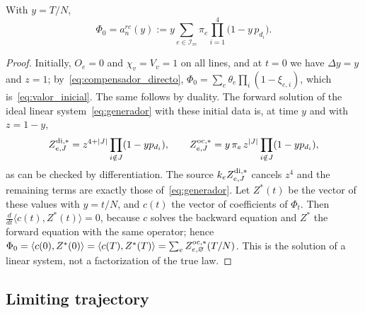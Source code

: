 \begin{lema}\label{lem:valor_inicial} With $y=T/N$, \begin{equation}\label{eq:valor_inicial}
 \Phi_0=a_n^{rc}(y):=y\sum_{e\in\mathcal I_{rc}}\pi_e\prod_{i=1}^4\bigl(1-y\,p_{d_i}\bigr).
\end{equation} \end{lema}

\begin{proof} Initially, $O_e=0$ and $\chi_v=V_v=1$ on all lines, and at $t=0$ we have $\Delta y=y$ and
$z=1$;
by~\eqref{eq:compensador_directo}, $\Phi_0=\sum_e\theta_e\prod_i(1-\xi_{e,i})$, which
is~\eqref{eq:valor_inicial}. The same follows
by duality. The forward solution of the ideal linear system~\eqref{eq:generador} with these initial data is,
at time $y$ and with
$z=1-y$, \[
 Z^{\mathrm{di},*}_{e,J}=z^{4+|J|}\prod_{i\notin J}(1-yp_{d_i}),\qquad
 Z^{\mathrm{oc},*}_{e,J}=y\,\pi_e\,z^{|J|}\prod_{i\notin J}(1-yp_{d_i}),
\] as can be checked by differentiation. The source $k_eZ^{\mathrm{di},*}_{e,J}$ cancels $z^4$ and the remaining
terms are exactly those
of~\eqref{eq:generador}. Let $Z^*(t)$ be the vector of these values with $y=t/N$, and $c(t)$ the vector of
coefficients of
$\Phi_t$. Then $\frac{d}{dt}\langle c(t),Z^*(t)\rangle=0$, because $c$ solves the backward equation and
$Z^*$ the forward equation
with the same operator; hence
$\Phi_0=\langle c(0),Z^*(0)\rangle=\langle c(T),Z^*(T)\rangle=\sum_eZ^{\mathrm{oc},*}_{e,\varnothing}(T/N)$.
This is the solution of a linear system, not a factorization of the true law. \end{proof}

\subsection{Limiting trajectory}\label{subsec:trayectoria}

